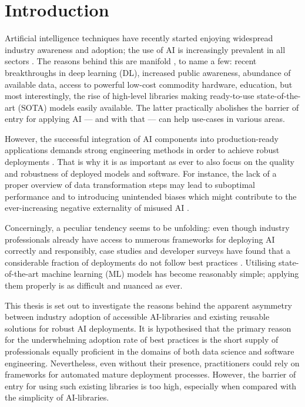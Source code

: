 \chapter{Introduction}

Artificial intelligence techniques have recently started enjoying widespread industry awareness and adoption; the use of AI is increasingly prevalent in all sectors \cite{wirtz2019artificial,bosch2021engineering}. The reasons behind this are manifold \cite{jordan2015machine}, to name a few: recent breakthroughs in deep learning (DL), increased public awareness, abundance of available data, access to powerful low-cost commodity hardware, education, but most interestingly, the rise of high-level libraries making ready-to-use state-of-the-art (SOTA) models easily available. The latter practically abolishes the barrier of entry for applying AI --- and with that --- can help use-cases in various areas. 

However, the successful integration of AI components into production-ready applications demands strong engineering methods in order to achieve robust deployments \cite{serban2020adoption}. That is why it is as important as ever to also focus on the quality and robustness of deployed models and software. For instance, the lack of a proper overview of data transformation steps may lead to suboptimal performance and to introducing unintended biases which might contribute to the ever-increasing negative externality of misused AI \cite{o2016weapons}.

Concerningly, a peculiar tendency seems to be unfolding: even though industry professionals already have access to numerous frameworks for deploying AI correctly and responsibly, case studies and developer surveys have found that a considerable fraction of deployments do not follow best practices \cite{serban2020adoption,haakman2021ai,amershi2019software,de2019understanding,sculley2015hidden}. Utilising state-of-the-art machine learning (ML) models has become reasonably simple; applying them properly is as difficult and nuanced as ever. 

This thesis is set out to investigate the reasons behind the apparent asymmetry between industry adoption of accessible AI-libraries and existing reusable solutions for robust AI deployments. It is hypothesised that the primary reason for the underwhelming adoption rate of best practices is the short supply of professionals equally proficient in the domains of both data science and software engineering. Nevertheless, even without their presence, practitioners could rely on frameworks for automated mature deployment processes. However, the barrier of entry for using such existing libraries is too high, especially when compared with the simplicity of AI-libraries.

